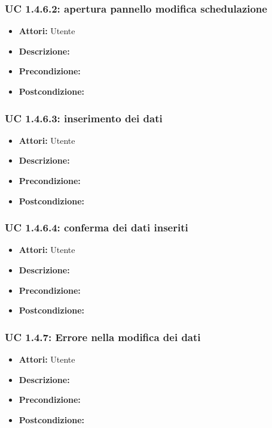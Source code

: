 \subsubsection{UC 1.4.6.2: apertura pannello modifica schedulazione}

\begin{itemize}
\item \textbf{Attori:} Utente
\item \textbf{Descrizione:} 
\item \textbf{Precondizione:} 
\item \textbf{Postcondizione:} 
\end{itemize}

\subsubsection{UC 1.4.6.3: inserimento dei dati}

\begin{itemize}
\item \textbf{Attori:} Utente
\item \textbf{Descrizione:} 
\item \textbf{Precondizione:} 
\item \textbf{Postcondizione:} 
\end{itemize}

\subsubsection{UC 1.4.6.4: conferma dei dati inseriti}

\begin{itemize}
\item \textbf{Attori:} Utente
\item \textbf{Descrizione:} 
\item \textbf{Precondizione:} 
\item \textbf{Postcondizione:} 
\end{itemize}

\subsubsection{UC 1.4.7: Errore nella modifica dei dati}

\begin{itemize}
\item \textbf{Attori:} Utente
\item \textbf{Descrizione:} 
\item \textbf{Precondizione:} 
\item \textbf{Postcondizione:} 
\end{itemize}

